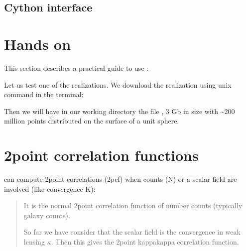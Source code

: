 \documentclass[letterpaper,10pt,english]{sphinxmanual}
\begin{document}
\section{Cython interface}
\label{\detokenize{python:cython-interface}}
\sphinxstepscope


\chapter{Hands on}
\label{\detokenize{handson:hands-on}}\label{\detokenize{handson::doc}}
\sphinxAtStartPar
This section describes a practical guide to use :

\sphinxAtStartPar
Let us test one of the  realizations. We download the realization using unix  command in the terminal:

\begin{sphinxVerbatim}[commandchars=\\\{\}]
 
\end{sphinxVerbatim}

\sphinxAtStartPar
Then we will have in our working directory the file , 3 Gb in size with \textasciitilde{}200 million points distributed on the surface of a unit sphere.

\sphinxstepscope


\chapter{2\sphinxhyphen{}point correlation functions}
\label{\detokenize{2pcf:point-correlation-functions}}\label{\detokenize{2pcf::doc}}
\sphinxAtStartPar
{} can compute 2\sphinxhyphen{}point correlations (2pcf) when counts (N) or a scalar field are involved (like convergence K):
\begin{quote}\begin{description}
\sphinxAtStartPar
It is the normal 2\sphinxhyphen{}point correlation function of number counts (typically
galaxy counts).

\sphinxAtStartPar
So far we have consider that the scalar field is the convergence in weak lensing \(\kappa\). Then this gives the 2\sphinxhyphen{}point kappa\sphinxhyphen{}kappa correlation function.

\end{description}\end{quote}
\end{document}
